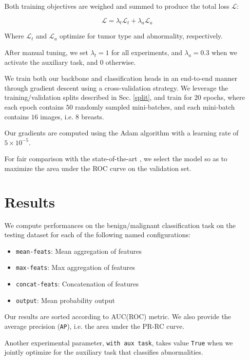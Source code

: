 \documentclass[11pt]{article}
\begin{document}
Both training objectives are weighed and summed to produce
the total loss \(\mathcal{L}\):

\begin{equation}
\mathcal{L} = \lambda_{t}\mathcal{L}_{t} + \lambda_{a}\mathcal{L}_{a}
\end{equation}

Where \(\mathcal{L}_t\) and \(\mathcal{L}_a\) optimize for tumor type
and abnormality, respectively.

After manual tuning, we set \(\lambda_t=1\) for all experiments,
and \(\lambda_a=0.3\) when we activate the auxiliary task, and \(0\) otherwise.

We train both our backbone and classification heads in an end-to-end manner through
gradient descent using a cross-validation strategy.
We leverage the training/validation splits described in Sec. \ref{split}, and train for
\(20\) epochs, where each epoch contains \(50\) randomly sampled mini-batches,
and each mini-batch contains \(16\) images, i.e. \(8\) breasts.

Our gradients are computed using the Adam algorithm with a learning rate of
\(5 \times 10^{-5}\).

For fair comparison with the state-of-the-art \autocite{walsh22}, we select the model so
as to maximize the area under the ROC curve on the validation set.

\section{Results}
\label{sec:orgbc224bc}

We compute performances on the benign/malignant classification task
on the testing dataset for each of the following named configurations:

\begin{itemize}
\item \texttt{mean-feats}: Mean aggregation of features
\item \texttt{max-feats}: Max aggregation of features
\item \texttt{concat-feats}: Concatenation of features
\item \texttt{output}: Mean probability output
\end{itemize}

Our results are sorted according to AUC(ROC) metric.
We also provide the average precision (\texttt{AP}), i.e. the area under the PR-RC curve.

Another experimental parameter, \texttt{with aux task}, takes value \texttt{True} when we jointly optimize for the
auxiliary task that classifies abnormalities.
\end{document}
